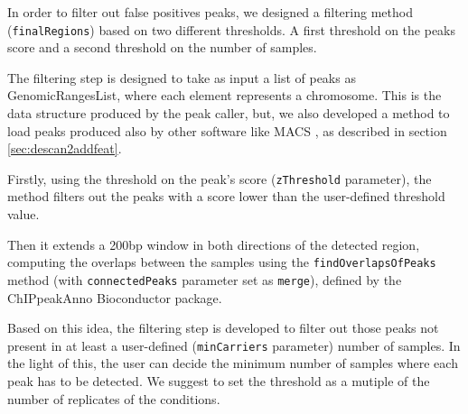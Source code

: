 
In order to filter out false positives peaks, we designed a filtering method (\lstinline{finalRegions}) based on two different thresholds.
A first threshold on the peaks score and a second threshold on the number of samples.

The filtering step is designed to take as input a list of peaks as GenomicRangesList, where each element represents a chromosome.
This is the data structure produced by the peak caller, but, we also developed a method to load peaks produced also by other software like MACS \cite{Zhang2008}, as described in section \ref{sec:descan2addfeat}.

Firstly, using the threshold on the peak's score (\lstinline{zThreshold} parameter), the method filters out the peaks with a score lower than the user-defined threshold value.

Then it extends a 200bp window in both directions of the detected region, computing the overlaps between the samples using the \lstinline{findOverlapsOfPeaks} method (with \lstinline{connectedPeaks} parameter set as \lstinline{merge}), defined by the ChIPpeakAnno \cite{Zhu2010} Bioconductor package.

Based on this idea, the filtering step is developed to filter out those peaks not present in at least a user-defined (\lstinline{minCarriers} parameter) number of samples. In the light of this, the user can decide the minimum number of samples where each peak has to be detected.
We suggest to set the threshold as a mutiple of the number of replicates of the conditions.

